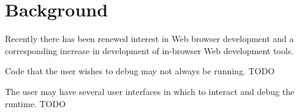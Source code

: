 \section {Background}
Recently there has been renewed interest in Web browser development and a
corresponding increase in development of in-browser Web development tools.

Code that the user wishes to debug may not always be running. TODO

The user may have several user interfaces in which to interact and debug the
runtime.
TODO